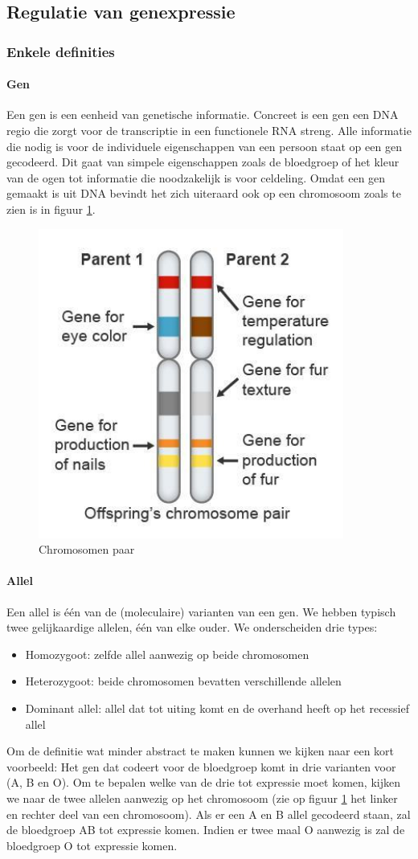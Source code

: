 \documentclass[a4paper,kul]{kulakarticle} %
\begin{document}
\subsection{Regulatie van genexpressie}

\subsubsection{Enkele definities}
\paragraph{Gen}
Een gen is een eenheid van genetische informatie. Concreet is een gen een DNA regio die zorgt voor de transcriptie in een functionele RNA streng. Alle informatie die nodig is voor de individuele eigenschappen van een persoon staat op een gen gecodeerd. Dit gaat van simpele eigenschappen zoals de bloedgroep of het kleur van de ogen tot informatie die noodzakelijk is voor celdeling. Omdat een gen gemaakt is uit DNA bevindt het zich uiteraard ook op een chromosoom zoals te zien is in figuur \ref{fig:chromosomenpaar}.
\begin{figure}[h]
	\centering
	\includegraphics[width=0.4\linewidth]{ChromosomenPaar}
	\caption[Chromosomen paar]{Chromosomen paar}
	\label{fig:chromosomenpaar}
\end{figure}
\newpage
\paragraph{Allel}
Een allel is één van de (moleculaire) varianten van een gen. We hebben typisch twee gelijkaardige allelen, één van elke ouder. We onderscheiden drie types:
\begin{itemize}
	\item Homozygoot: zelfde allel aanwezig op beide chromosomen
	\item Heterozygoot: beide chromosomen bevatten verschillende allelen
	\item Dominant allel: allel dat tot uiting komt en de overhand heeft op het recessief allel
\end{itemize}
Om de definitie wat minder abstract te maken kunnen we kijken naar een kort voorbeeld: Het gen dat codeert voor de bloedgroep komt in drie varianten voor (A, B en O). Om te bepalen welke van de drie tot expressie moet komen, kijken we naar de twee allelen aanwezig op het chromosoom (zie op figuur \ref{fig:chromosomenpaar} het linker en rechter deel van een chromosoom). Als er een A en B allel gecodeerd staan, zal de bloedgroep AB tot expressie komen. Indien er twee maal O aanwezig is zal de bloedgroep O tot expressie komen. 
\end{document}
